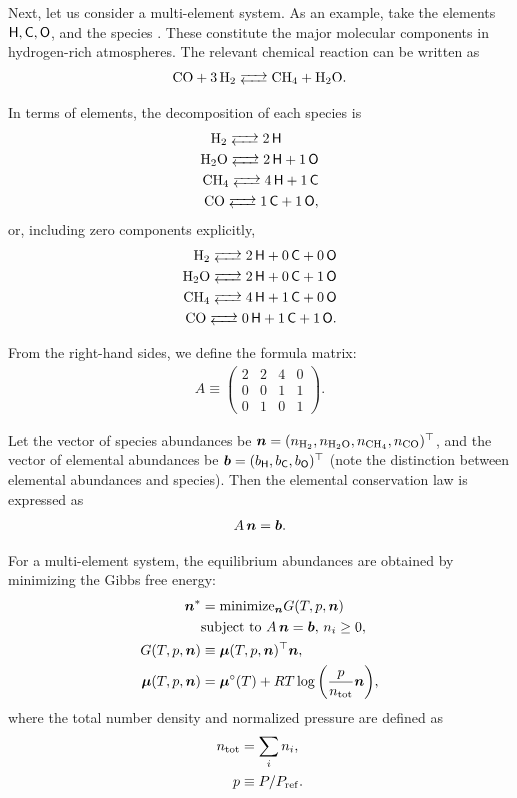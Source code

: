 Next, let us consider a multi-element system.  
As an example, take the elements $\mathsf{H}, \mathsf{C}, \mathsf{O}$, and the species . These constitute the major molecular components in hydrogen-rich atmospheres. The relevant chemical reaction can be written as
\begin{align*}
\ce{CO + 3 H2 <--> CH4 + H2O}.
\end{align*}

In terms of elements, the decomposition of each species is
\begin{align*}
\ce{H2 <--> 2 $\Hel$ \, \, \, \, \, \, \, \, \\
H2O <--> 2 $\Hel$ + 1 $\Oel$ \\
CH4 <--> 4 $\Hel$ + 1 $\Cel$ \\
CO <-->  1 $\Cel$ + 1 $\Oel$},
\end{align*}
or, including zero components explicitly,
\begin{align*}
\ce{H2 <--> 2 $\Hel$ + 0 $\Cel$ + 0 $\Oel$ \\
H2O <--> 2 $\Hel$ + 0 $\Cel$ + 1 $\Oel$ \\
CH4 <--> 4 $\Hel$ + 1 $\Cel$ + 0 $\Oel$ \\
CO <--> 0 $\Hel$ + 1 $\Cel$ + 1 $\Oel$ }.
\end{align*}

From the right-hand sides, we define the formula matrix:
\begin{align*}
  A \equiv
\begin{pmatrix} 
2 & 2 & 4 & 0 \\
0 & 0 & 1 & 1 \\
0 & 1 & 0 & 1 
\end{pmatrix}.
\end{align*}

Let the vector of species abundances be $\boldsymbol{n} = (n_\mathrm{H_2}, n_\mathrm{H_2 O},n_\mathrm{CH_4},n_\mathrm{CO})^\top$, and the vector of elemental abundances be $\boldsymbol{b} = (b_{\mathsf{H}}, b_{\mathsf{C}}, b_{\mathsf{O}})^\top$ (note the distinction between elemental abundances and species). Then the elemental conservation law is expressed as
\begin{align}
    A \, \boldsymbol{n} = \boldsymbol{b}.
\end{align}

For a multi-element system, the equilibrium abundances are obtained by minimizing the Gibbs free energy:
\begin{align}
\label{eq:gibss_multi}
    \boldsymbol{n}^\ast &= \mathrm{minimize}_{\boldsymbol{n}} G(T, p, \boldsymbol{n}) \nonumber \\
    &\mbox{subject to} \,\, A \, \boldsymbol{n} = \boldsymbol{b}, \, n_i \ge 0, \\
    G(T, p, \boldsymbol{n}) &\equiv  \boldsymbol{\mu} (T, p, \boldsymbol{n})^\top \boldsymbol{n}, \\ 
    \label{eq:chemical_potential_mu}
    \boldsymbol{\mu} (T, p, \boldsymbol{n}) &=  \boldsymbol{\mu}^\circ(T) + RT \log{\left(\frac{p}{n_\mathrm{tot}} \boldsymbol{n}\right)} ,
\end{align}
where the total number density and normalized pressure are defined as
\begin{align}
\label{eq:ntot_tce}
    n_\mathrm{tot} &= \sum_i n_i, \\
    p &\equiv P/P_\mathrm{ref}.
\end{align}

